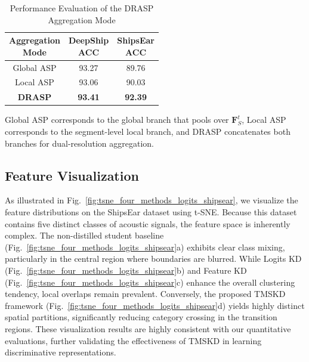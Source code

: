 ﻿\documentclass[lettersize,journal]{IEEEtran}
\begin{document}
\begin{table}[htbp]
\centering
\caption{Performance Evaluation of the DRASP Aggregation Mode}
\label{tab:drasp_analysis}
\small
\setlength{\tabcolsep}{10pt}
\begin{tabular}{c|c|c}
\toprule
\makecell{Aggregation\\Mode} &
\makecell{DeepShip\\ACC} &
\makecell{ShipsEar\\ACC} \\
\midrule
Global ASP & 93.27 & 89.76 \\
Local ASP  & 93.06 & 90.03 \\
\rowcolor{gray!15}
\textbf{DRASP} & \textbf{93.41} & \textbf{92.39} \\
\bottomrule
\end{tabular}
\vspace{0.5ex}
\par\footnotesize Global ASP corresponds to the global branch that pools over $\mathbf{F}_S^t$, Local ASP corresponds to the segment-level local branch, and DRASP concatenates both branches for dual-resolution aggregation.
\end{table}

\subsection{Feature Visualization}

As illustrated in Fig.~\ref{fig:tsne_four_methods_logits_shipsear}, we visualize the feature distributions on the ShipsEar dataset using t-SNE. Because this dataset contains five distinct classes of acoustic signals, the feature space is inherently complex. The non-distilled student baseline (Fig.~\ref{fig:tsne_four_methods_logits_shipsear}a) exhibits clear class mixing, particularly in the central region where boundaries are blurred. While Logits KD (Fig.~\ref{fig:tsne_four_methods_logits_shipsear}b) and Feature KD (Fig.~\ref{fig:tsne_four_methods_logits_shipsear}c) enhance the overall clustering tendency, local overlaps remain prevalent. Conversely, the proposed TMSKD framework (Fig.~\ref{fig:tsne_four_methods_logits_shipsear}d) yields highly distinct spatial partitions, significantly reducing category crossing in the transition regions. These visualization results are highly consistent with our quantitative evaluations, further validating the effectiveness of TMSKD in learning discriminative representations.
\end{document}
